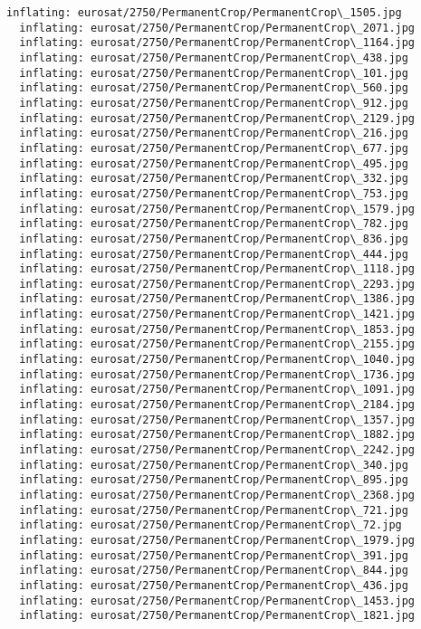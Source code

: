 \documentclass[11pt]{article}
\begin{document}
\begin{Verbatim}[commandchars=\\\{\}]
  inflating: eurosat/2750/PermanentCrop/PermanentCrop\_1505.jpg
  inflating: eurosat/2750/PermanentCrop/PermanentCrop\_2071.jpg
  inflating: eurosat/2750/PermanentCrop/PermanentCrop\_1164.jpg
  inflating: eurosat/2750/PermanentCrop/PermanentCrop\_438.jpg
  inflating: eurosat/2750/PermanentCrop/PermanentCrop\_101.jpg
  inflating: eurosat/2750/PermanentCrop/PermanentCrop\_560.jpg
  inflating: eurosat/2750/PermanentCrop/PermanentCrop\_912.jpg
  inflating: eurosat/2750/PermanentCrop/PermanentCrop\_2129.jpg
  inflating: eurosat/2750/PermanentCrop/PermanentCrop\_216.jpg
  inflating: eurosat/2750/PermanentCrop/PermanentCrop\_677.jpg
  inflating: eurosat/2750/PermanentCrop/PermanentCrop\_495.jpg
  inflating: eurosat/2750/PermanentCrop/PermanentCrop\_332.jpg
  inflating: eurosat/2750/PermanentCrop/PermanentCrop\_753.jpg
  inflating: eurosat/2750/PermanentCrop/PermanentCrop\_1579.jpg
  inflating: eurosat/2750/PermanentCrop/PermanentCrop\_782.jpg
  inflating: eurosat/2750/PermanentCrop/PermanentCrop\_836.jpg
  inflating: eurosat/2750/PermanentCrop/PermanentCrop\_444.jpg
  inflating: eurosat/2750/PermanentCrop/PermanentCrop\_1118.jpg
  inflating: eurosat/2750/PermanentCrop/PermanentCrop\_2293.jpg
  inflating: eurosat/2750/PermanentCrop/PermanentCrop\_1386.jpg
  inflating: eurosat/2750/PermanentCrop/PermanentCrop\_1421.jpg
  inflating: eurosat/2750/PermanentCrop/PermanentCrop\_1853.jpg
  inflating: eurosat/2750/PermanentCrop/PermanentCrop\_2155.jpg
  inflating: eurosat/2750/PermanentCrop/PermanentCrop\_1040.jpg
  inflating: eurosat/2750/PermanentCrop/PermanentCrop\_1736.jpg
  inflating: eurosat/2750/PermanentCrop/PermanentCrop\_1091.jpg
  inflating: eurosat/2750/PermanentCrop/PermanentCrop\_2184.jpg
  inflating: eurosat/2750/PermanentCrop/PermanentCrop\_1357.jpg
  inflating: eurosat/2750/PermanentCrop/PermanentCrop\_1882.jpg
  inflating: eurosat/2750/PermanentCrop/PermanentCrop\_2242.jpg
  inflating: eurosat/2750/PermanentCrop/PermanentCrop\_340.jpg
  inflating: eurosat/2750/PermanentCrop/PermanentCrop\_895.jpg
  inflating: eurosat/2750/PermanentCrop/PermanentCrop\_2368.jpg
  inflating: eurosat/2750/PermanentCrop/PermanentCrop\_721.jpg
  inflating: eurosat/2750/PermanentCrop/PermanentCrop\_72.jpg
  inflating: eurosat/2750/PermanentCrop/PermanentCrop\_1979.jpg
  inflating: eurosat/2750/PermanentCrop/PermanentCrop\_391.jpg
  inflating: eurosat/2750/PermanentCrop/PermanentCrop\_844.jpg
  inflating: eurosat/2750/PermanentCrop/PermanentCrop\_436.jpg
  inflating: eurosat/2750/PermanentCrop/PermanentCrop\_1453.jpg
  inflating: eurosat/2750/PermanentCrop/PermanentCrop\_1821.jpg

\end{Verbatim}
\end{document}

